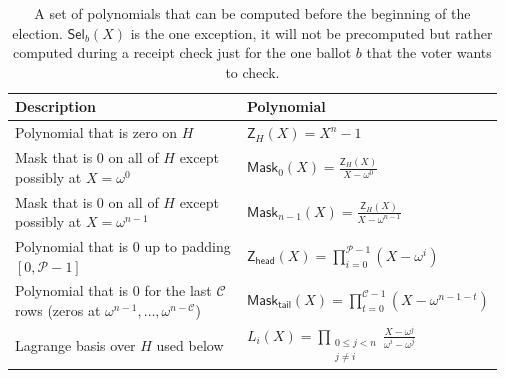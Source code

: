 

\begin{table}[t]
\small
\setlength{\tabcolsep}{5pt}
\renewcommand{\arraystretch}{1.15}
\caption{A set of polynomials that can be computed before the beginning of the election. $\mathsf{Sel}_{b}(X)$ is the one exception, it will not be precomputed but rather computed during a receipt check just for the one ballot $b$ that the voter wants to check.}
\label{tab:selectors}
\begin{tabular}{@{}p{0.58\linewidth}|p{0.39\linewidth}@{}}
\toprule
\textbf{Description} & \textbf{Polynomial} \\
\midrule

Polynomial that is zero on $H$ &
$\mathsf{Z}_H(X)=X^n-1$ \\



Mask that is $0$ on all of $H$ except possibly at $X=\omega^0$ &
$\mathsf{Mask}_{0}(X)=\displaystyle\frac{\mathsf{Z}_H(X)}{X-\omega^0}$ \\

Mask that is $0$ on all of $H$ except possibly at $X=\omega^{n-1}$ &
$\mathsf{Mask}_{n-1}(X)=\displaystyle\frac{\mathsf{Z}_H(X)}{X-\omega^{n-1}}$ \\ \hline

Polynomial that is 0 up to padding $[0,\mathcal{P}-1]$ &
$\mathsf{Z}_{\mathsf{head}}(X)=\displaystyle\prod_{i=0}^{\mathcal{P}-1}\left(X-\omega^i\right)$ \\

Polynomial that is 0 for the last $\mathcal{C}$ rows (zeros at $\omega^{n-1},\dots,\omega^{n-\mathcal{C}}$) &
$\mathsf{Mask}_{\mathsf{tail}}(X)=\displaystyle\prod_{t=0}^{\mathcal{C}-1}\left(X-\omega^{n-1-t}\right)$ \\ \hline


Lagrange basis over $H$ used below &
$L_i(X)=\displaystyle\prod_{\substack{0\le j<n\\ j\ne i}}\frac{X-\omega^j}{\omega^i-\omega^j}$ \\


\end{tabular}
\end{table}
